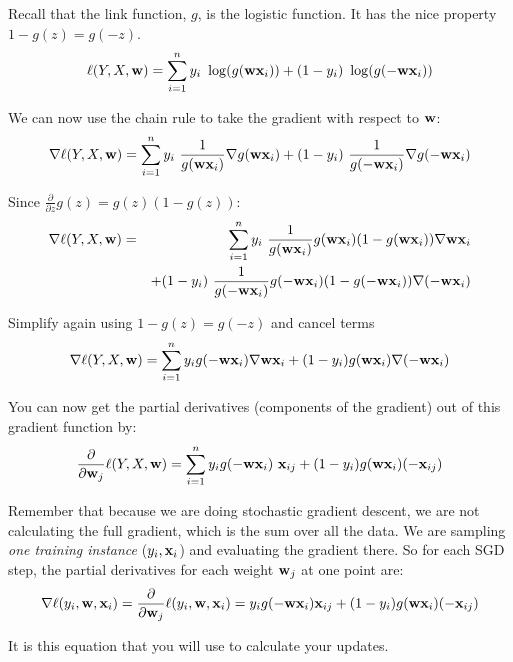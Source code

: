 \documentclass[11pt]{article}
\newcommand{\vw}{{\bf w}}
\newcommand{\vx}{{\bf x}}
\newcommand{\vxi}{{\bf x}_i}
\newcommand{\vxij}{{\bf x}_{ij}}
\begin{document}
Recall that the link function, $g$, is the logistic function. It has the nice property $1 - g(z) = g(-z)$.
\begin{equation}
\ell(Y,X,\vw) = \sum_{i=1}^n{ y_i\ \log( g(\vw \vxi) ) + (1-y_i)\ \log( g(-\vw \vxi) )}
\end{equation}

We can now use the chain rule to take the gradient with respect to $\vw$:
\begin{equation}
\nabla \ell(Y,X,\vw) = \sum_{i=1}^n{
	y_i\ \frac{1}{g(\vw \vxi)} \nabla g(\vw \vxi)
	+ (1-y_i)\ \frac{1}{g(-\vw \vxi)} \nabla g(-\vw \vxi)
}
\end{equation}

Since $\frac{\partial}{\partial z}g(z) = g(z)(1-g(z))$:
\begin{eqnarray}
\nabla \ell(Y,X,\vw) &=& \sum_{i=1}^n
	 y_i\ \frac{1}{g(\vw \vxi)} g(\vw \vxi) (1-g(\vw \vxi)) \nabla \vw \vxi \\
& & 	+ (1-y_i)\ \frac{1}{g(-\vw \vxi)} g(-\vw \vxi) (1-g(-\vw \vxi)) \nabla (-\vw \vxi)
\end{eqnarray}

Simplify again using $1-g(z) = g(-z)$ and cancel terms
\begin{equation}
\nabla \ell(Y,X,\vw) = \sum_{i=1}^n{
	y_i g(-\vw \vxi) \nabla \vw \vxi
	+ (1-y_i) g(\vw \vxi) \nabla (-\vw \vxi)
}
\end{equation}

You can now get the partial derivatives (components of the gradient) out of this gradient function by:
\begin{equation}
\frac{\partial}{\partial \vw_j} \ell(Y,X,\vw) = \sum_{i=1}^n{
	y_i g(-\vw \vxi) \ \vxij
	+ (1-y_i) g(\vw \vxi) (-\vxij)
}
\end{equation}

Remember that because we are doing stochastic gradient descent, we are not calculating the full gradient, which is the sum over all the data. We are sampling \emph{one training instance} ($y_i, \vx_i$) and evaluating the gradient there. So for each SGD step, the partial derivatives for each weight $\vw_j$ at one point are:
\begin{equation}
\nabla \ell(y_i, \vw, \vxi) = \frac{\partial}{\partial \vw_j} \ell(y_i, \vw, \vxi) =
	y_i g(-\vw \vxi) \vxij + (1-y_i) g(\vw \vxi) (-\vxij)
\end{equation}

It is this equation that you will use to calculate your updates.

\end{document}
